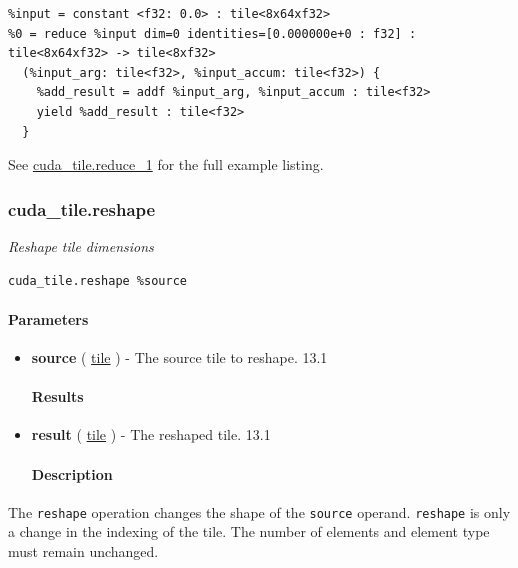 \documentclass{article}
\begin{document}
\begin{lstlisting}
%input = constant <f32: 0.0> : tile<8x64xf32>
%0 = reduce %input dim=0 identities=[0.000000e+0 : f32] : tile<8x64xf32> -> tile<8xf32>
  (%input_arg: tile<f32>, %input_accum: tile<f32>) {
    %add_result = addf %input_arg, %input_accum : tile<f32>
    yield %add_result : tile<f32>
  }
\end{lstlisting}

See \href{https://docs.nvidia.com/cuda/tile-ir/latest/sections/appendix.html#example-cuda-tile-reduce-1}{cuda\_tile.reduce\_1} for the full example listing.



\subsubsection{cuda\_tile.reshape}

\textit{Reshape tile dimensions}


\begin{lstlisting}
cuda_tile.reshape %source
\end{lstlisting}

\paragraph{Parameters}

\begin{itemize}
\item \textbf{source} ( \href{https://docs.nvidia.com/cuda/tile-ir/latest/sections/types.html#type-tile}{tile} ) - The source tile to reshape. 13.1


\paragraph{Results}

\item \textbf{result} ( \href{https://docs.nvidia.com/cuda/tile-ir/latest/sections/types.html#type-tile}{tile} ) - The reshaped tile. 13.1


\paragraph{Description}

\end{itemize}
The \texttt{reshape} operation changes the shape of the \texttt{source} operand. \texttt{reshape} is only a change in the indexing of the tile. The number of elements and element type must remain unchanged.
\end{document}
